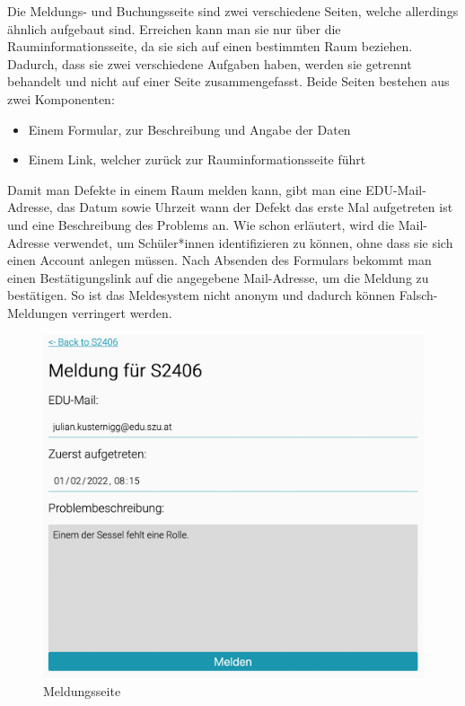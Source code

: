
Die Meldungs- und Buchungsseite sind zwei verschiedene Seiten, welche allerdings ähnlich aufgebaut sind. Erreichen kann man sie nur über die Rauminformationsseite, da sie sich auf einen bestimmten Raum beziehen. Dadurch, dass sie zwei verschiedene Aufgaben haben, werden sie getrennt behandelt und nicht auf einer Seite zusammengefasst. Beide Seiten bestehen aus zwei Komponenten:
\begin{itemize}
    \item Einem Formular, zur Beschreibung und Angabe der Daten
    \item Einem Link, welcher zurück zur Rauminformationsseite führt
\end{itemize}

Damit man Defekte in einem Raum melden kann, gibt man eine EDU-Mail-Adresse, das Datum sowie Uhrzeit wann der Defekt das erste Mal aufgetreten ist und eine Beschreibung des Problems an. Wie schon erläutert, wird die Mail-Adresse verwendet, um Schüler*innen identifizieren zu können, ohne dass sie sich einen Account anlegen müssen. Nach Absenden des Formulars bekommt man einen Bestätigungslink auf die angegebene Mail-Adresse, um die Meldung zu bestätigen. So ist das Meldesystem nicht anonym und dadurch können Falsch-Meldungen verringert werden.

\begin{figure}[H]
    \centering
    \includegraphics[width=120mm]{media/WebComponents/Meldungsseite_light.png}
    \caption{Meldungsseite}
\end{figure}

